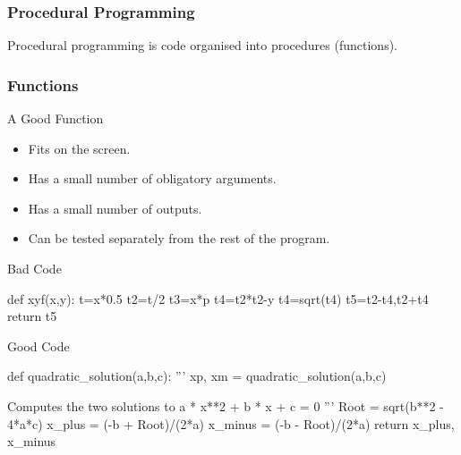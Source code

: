\begin{frame}[fragile]
\frametitle{Procedural Programming}
Procedural programming is code organised into procedures (functions).
\end{frame}

\begin{frame}[fragile]
\frametitle{Functions}
\begin{block}{A Good Function}
\begin{itemize}
\item Fits on the screen.
\item Has a small number of obligatory arguments.
\item Has a small number of outputs.
\item Can be tested separately from the rest of the program.
\end{itemize}
\end{block}
\end{frame}

\begin{frame}[fragile]
\begin{block}{Bad Code}
\begin{python}
def xyf(x,y):
    t=x*0.5
    t2=t/2
    t3=x*p
    t4=t2*t2-y
    t4=sqrt(t4)
    t5=t2-t4,t2+t4
    return t5

\end{python}
\end{block}
\end{frame}

\begin{frame}[fragile]

\begin{block}{Good Code}
\begin{python}
def quadratic_solution(a,b,c):
    '''
    xp, xm = quadratic_solution(a,b,c)

    Computes the two solutions to
        a * x**2 + b * x + c = 0
    '''
    Root = sqrt(b**2 - 4*a*c)
    x_plus = (-b + Root)/(2*a)
    x_minus = (-b - Root)/(2*a)
    return x_plus, x_minus

\end{python}

\end{block}
\end{frame}


